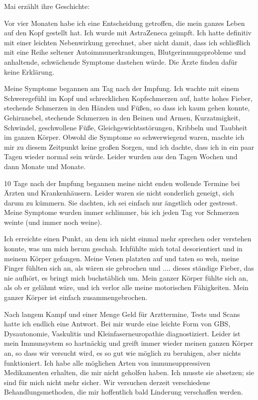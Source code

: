 Mai erzählt ihre Geschichte:

Vor vier Monaten habe ich eine Entscheidung getroffen, die mein ganzes Leben auf
den Kopf gestellt hat. Ich wurde mit AstraZeneca geimpft. Ich hatte definitiv
mit einer leichten Nebenwirkung gerechnet, aber nicht damit, dass ich
schließlich mit eine Reihe seltener Autoimmunerkrankungen,
Blutgerinnungsprobleme und anhaltende, schwächende Symptome dastehen würde. Die
Ärzte finden dafür keine Erklärung.

Meine Symptome begannen am Tag nach der Impfung. Ich wachte mit einem
Schweregefühl im Kopf und schrecklichen Kopfschmerzen auf, hatte hohes Fieber,
stechende Schmerzen in den Händen und Füßen, so dass ich kaum gehen konnte,
Gehirnnebel, stechende Schmerzen in den Beinen und Armen, Kurzatmigkeit,
Schwindel, geschwollene Füße, Gleichgewichtsstörungen, Kribbeln und Taubheit im
ganzen Körper. Obwohl die Symptome so schwerwiegend waren, machte ich mir zu
diesem Zeitpunkt keine großen Sorgen, und ich dachte, dass ich in ein paar Tagen
wieder normal sein würde. Leider wurden aus den Tagen Wochen und dann Monate und
Monate.

10 Tage nach der Impfung begannen meine nicht enden wollende Termine bei Ärzten
und Krankenhäusern. Leider waren sie nicht sonderlich geneigt, sich darum zu
kümmern. Sie dachten, ich sei einfach nur ängstlich oder gestresst. Meine
Symptome wurden immer schlimmer, bis ich jeden Tag vor Schmerzen weinte (und
immer noch weine).

Ich erreichte einen Punkt, an dem ich nicht einmal mehr sprechen oder verstehen
konnte, was um mich herum geschah. Ichfühlte mich total desorientiert und in
meinem Körper gefangen. Meine Venen platzten auf und taten so weh, meine Finger
fühlten sich an, als wären sie gebrochen und .... dieses ständige Fieber, das
nie aufhört, es bringt mich buchstäblich um. Mein ganzer Körper fühlte sich an,
als ob er gelähmt wäre, und ich verlor alle meine motorischen Fähigkeiten. Mein
ganzer Körper ist einfach zusammengebrochen.

Nach langem Kampf und einer Menge Geld für Arzttermine, Tests und Scans hatte
ich endlich eine Antwort. Bei mir wurde eine leichte Form von GBS, Dysautonomie,
Vaskulitis und Kleinfaserneuropathie diagnostiziert. Leider ist mein Immunsystem
so hartnäckig und greift immer wieder meinen ganzen Körper an, so dass wir
versucht wird, es so gut wie möglich zu beruhigen, aber nichts funktioniert. Ich
habe alle möglichen Arten von immunsuppressiven Medikamenten erhalten, die mir
nicht geholfen haben. Ich musste sie absetzen; sie sind für mich nicht mehr
sicher. Wir versuchen derzeit verschiedene Behandlungsmethoden, die mir
hoffentlich bald Linderung verschaffen werden.

